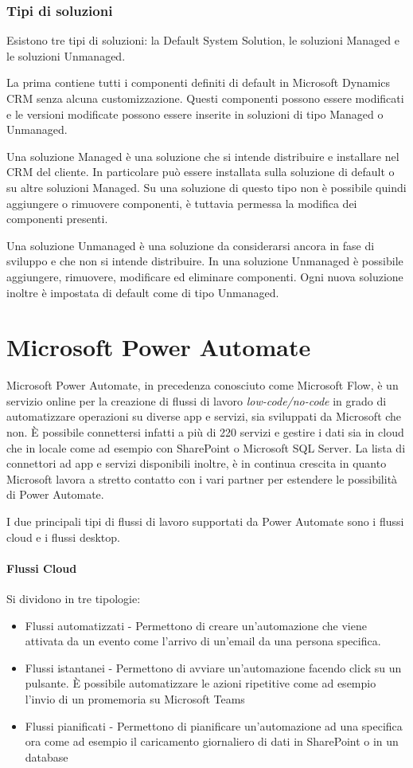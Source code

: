 \subsubsection{Tipi di soluzioni}
Esistono tre tipi di soluzioni: la Default System Solution, le soluzioni Managed e le soluzioni Unmanaged.

La prima contiene tutti i componenti definiti di default in Microsoft Dynamics CRM senza alcuna customizzazione. Questi componenti possono essere modificati e le versioni modificate possono essere inserite in soluzioni di tipo Managed o Unmanaged.

Una soluzione Managed è una soluzione che si intende distribuire e installare nel CRM del cliente. In particolare può essere installata sulla soluzione di default o su altre soluzioni Managed. Su una soluzione di questo tipo non è possibile quindi aggiungere o rimuovere componenti, è tuttavia permessa la modifica dei componenti presenti.

Una soluzione Unmanaged è una soluzione da considerarsi ancora in fase di sviluppo e che non si intende distribuire. In una soluzione Unmanaged è possibile aggiungere, rimuovere, modificare ed eliminare componenti. Ogni nuova soluzione inoltre è impostata di default come di tipo Unmanaged.~\cite{DynamicsTutorialspoint}

\section{Microsoft Power Automate}
Microsoft Power Automate, in precedenza conosciuto come Microsoft Flow, è un servizio online per la creazione di flussi di lavoro \textit{low-code/no-code} in grado di automatizzare operazioni su diverse app e servizi, sia sviluppati da Microsoft che non.
È possibile connettersi infatti a più di 220 servizi e gestire i dati sia in cloud che in locale come ad esempio con SharePoint o Microsoft SQL Server. La lista di connettori ad app e servizi disponibili inoltre, è in continua crescita in quanto Microsoft lavora a stretto contatto con i vari partner per estendere le possibilità di Power Automate.~\cite{FlussiPowerAutomate}

I due principali tipi di flussi di lavoro supportati da Power Automate sono i flussi cloud e i flussi desktop.
\paragraph{Flussi Cloud} Si dividono in tre tipologie:
\begin{itemize}
  \item Flussi automatizzati - Permettono di creare un'automazione che viene attivata da un evento come l'arrivo di un'email da una persona specifica. 
  \item Flussi istantanei - Permettono di avviare un'automazione facendo click su un pulsante. È possibile automatizzare le azioni ripetitive come ad esempio l'invio di un promemoria su Microsoft Teams
  \item Flussi pianificati - Permettono di pianificare un'automazione ad una specifica ora come ad esempio il caricamento giornaliero di dati in SharePoint o in un database
\end{itemize}

